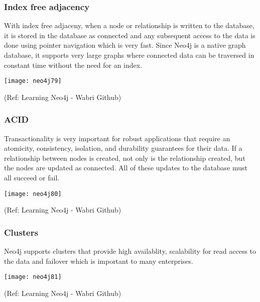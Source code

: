 \begin{frame}\frametitle{Index free adjacency }
With index free adjaceny, when a node or relationship is written to the database, it is stored in the database as connected and any subsequent access to the data is done using pointer navigation which is very fast. Since Neo4j is a native graph database, it supports very large graphs where connected data can be traversed in constant time without the need for an index.

\begin{center}
\texttt{[image: neo4j79]}
\end{center}	

{\tiny (Ref: Learning Neo4j - Wabri Github)}
\end{frame}

\begin{frame}\frametitle{ACID }
Transactionality is very important for robust applications that require an atomicity, consistency, isolation, and durability guarantees for their data. If a relationship between nodes is created, not only is the relationship created, but the nodes are updated as connected. All of these updates to the database must all succeed or fail.


\begin{center}
\texttt{[image: neo4j80]}
\end{center}	

{\tiny (Ref: Learning Neo4j - Wabri Github)}
\end{frame}

\begin{frame}\frametitle{Clusters }
Neo4j supports clusters that provide high availablity, scalability for read access to the data and failover which is important to many enterprises.

\begin{center}
\texttt{[image: neo4j81]}
\end{center}	

{\tiny (Ref: Learning Neo4j - Wabri Github)}
\end{frame}

